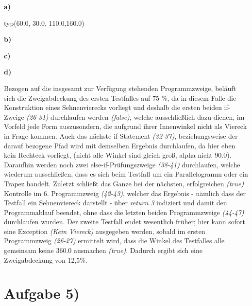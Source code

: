 \documentclass{swp1}
\begin{document}
\textbf{a)}\newline

typ(60.0, 30.0, 110.0,160.0)\newline

\textbf{b)}\newline



\textbf{c)}\newline



\textbf{d)}\newline

Bezogen auf die insgesamt zur Verfügung stehenden Programmzweige, beläuft sich die Zweigabdeckung des ersten Testfalles auf 75 \%, da in diesem Falle die Konstruktion eines Sehnenvierecks vorliegt und deshalb die ersten beiden if-Zweige \emph{(26-31)} durchlaufen werden \emph{(false)}, welche ausschließlich dazu dienen, im Vorfeld jede Form auszusondern, die aufgrund ihrer Innenwinkel nicht als Viereck in Frage kommen.\newline
Auch das nächste if-Statement \emph{(32-37)}, beziehungsweise der darauf bezogene Pfad wird mit demselben Ergebnis durchlaufen, da hier eben kein Rechteck vorliegt, (nicht alle Winkel sind gleich groß, alpha nicht 90.0).\newline
Daraufhin werden noch zwei else-if-Prüfungszweige \emph{(38-41)} durchlaufen, welche wiederum ausschließen, dass es sich beim Testfall um ein Parallelogramm oder ein Trapez handelt.\newline
Zuletzt schließt das Ganze bei der nächsten, erfolgreichen \emph{(true)} Kontrolle im 6. Programmzweig \emph{(42-43)}, welcher das Ergebnis - nämlich dass der Testfall ein Sehnenviereck darstellt - über \emph{return 3} indiziert und damit den Programmablauf beendet, ohne dass die letzten beiden Programmzweige \emph{(44-47)} durchlaufen wurden.\newline
\newline
Der zweite Testfall endet wesentlich früher; hier kann sofort eine Exception \emph{(Kein Viereck)} ausgegeben werden, sobald im ersten Programmzweig \emph{(26-27)} ermittelt wird, dass die Winkel des Testfalles alle gemeinsam keine 360.0 ausmachen \emph{(true)}.\newline
Dadurch ergibt sich eine Zweigabdeckung von 12,5\%.\newline

\section*{Aufgabe 5)}
\end{document}
